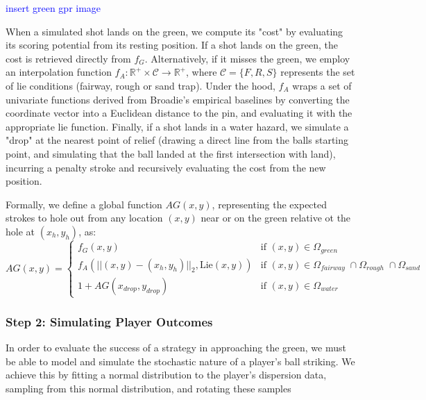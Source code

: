 \documentclass[11pt, letterpaper]{article}
\begin{document}
\textcolor{blue}{insert green gpr image}

When a simulated shot lands on the green, we compute its "cost" by evaluating its scoring potential from its resting position. If a shot lands on the green, the cost is retrieved directly from $f_G$. Alternatively, if it misses the green, we employ an interpolation function $f_A: \mathbb{R}^+ \times \mathcal{C} \to \mathbb{R}^+$, where $\mathcal{C} = \{F, R, S\}$ represents the set of lie conditions (fairway, rough or sand trap). Under the hood, $f_A$ wraps a set of univariate functions derived from Broadie's empirical baselines by converting the coordinate vector into a Euclidean distance to the pin, and evaluating it with the appropriate lie function. Finally, if a shot lands in a water hazard, we simulate a "drop" at the nearest point of relief (drawing a direct line from the balls starting point, and simulating that the ball landed at the first intersection with land), incurring a penalty stroke and recursively evaluating the cost from the new position.

Formally, we define a global function $AG(x,y)$, representing the expected strokes to hole out from any location $(x,y)$ near or on the green relative ot the hole at $(x_h, y_h)$, as:
\[
AG(x,y) = \begin{cases}
    f_G(x,y) & \text{if } (x, y) \in \Omega_{green} \\
    f_A\left (||(x,y) - (x_h, y_h)||_2, \text{Lie}(x,y)\right) & \text{if } (x, y) \in \Omega_{fairway}\; \cap \Omega_{rough} \; \cap \Omega_{sand}  \\
    1 + AG(x_{drop}, y_{drop}) & \text{if } (x, y) \in \Omega_{water}
\end{cases}
\]
\subsubsection{Step 2: Simulating Player Outcomes}
In order to evaluate the success of a strategy in approaching the green, we must be able to model and simulate the stochastic nature of a player's ball striking. We achieve this by fitting a normal distribution to the player's dispersion data, sampling from this normal distribution, and rotating these samples
\end{document}
